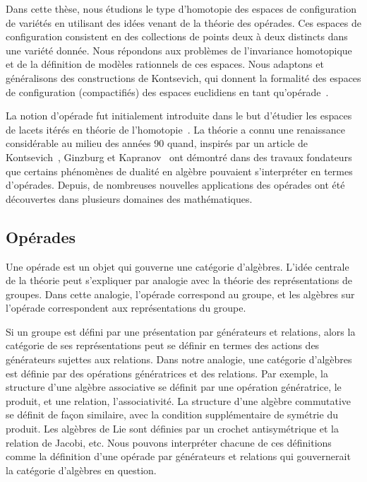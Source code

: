 
Dans cette thèse, nous étudions le type d'homotopie des espaces de configuration de variétés en utilisant des idées venant de la théorie des opérades.
Ces espaces de configuration consistent en des collections de points deux à deux distincts dans une variété donnée.
Nous répondons aux problèmes de l'invariance homotopique et de la définition de modèles rationnels de ces espaces.
Nous adaptons et généralisons des constructions de Kontsevich, qui donnent la formalité des espaces de configuration (compactifiés) des espaces euclidiens en tant qu'opérade~\cite{Kontsevich1999}.

La notion d'opérade fut initialement introduite dans le but d'étudier les espaces de lacets itérés en théorie de l'homotopie~\cite{May1972,BoardmanVogt1973}.
La théorie a connu une renaissance considérable au milieu des années 90 quand, inspirés par un article de Kontsevich~\cite{Kontsevich1993a}, Ginzburg et Kapranov~\cite{GinzburgKapranov1994} ont démontré dans des travaux fondateurs que certains phénomènes de dualité en algèbre pouvaient s'interpréter en termes d'opérades.
Depuis, de nombreuses nouvelles applications des opérades ont été découvertes dans plusieurs domaines des mathématiques.


\subsection*{Opérades}

Une opérade est un objet qui gouverne une catégorie d'algèbres.
L'idée centrale de la théorie peut s'expliquer par analogie avec la théorie des représentations de groupes.
Dans cette analogie, l'opérade correspond au groupe, et les algèbres sur l'opérade correspondent aux représentations du groupe.

Si un groupe est défini par une présentation par générateurs et relations, alors la catégorie de ses représentations peut se définir en termes des actions des générateurs sujettes aux relations.
Dans notre analogie, une catégorie d'algèbres est définie par des opérations génératrices et des relations.
Par exemple, la structure d'une algèbre associative se définit par une opération génératrice, le produit, et une relation, l'associativité.
La structure d'une algèbre commutative se définit de façon similaire, avec la condition supplémentaire de symétrie du produit.
Les algèbres de Lie sont définies par un crochet antisymétrique et la relation de Jacobi, etc.
Nous pouvons interpréter chacune de ces définitions comme la définition d'une opérade par générateurs et relations qui gouvernerait la catégorie d'algèbres en question.

